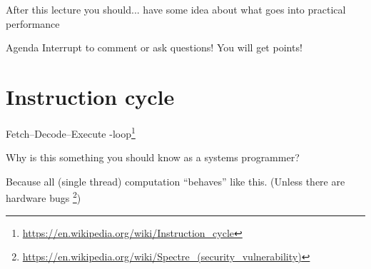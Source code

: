 \documentclass[11pt, aspectratio=169, table]{beamer}
\begin{document}

\begin{frame}{After this lecture you should...}
have some idea about what goes into practical performance
\end{frame}

\begin{frame}{Agenda}
\setlength\parskip{\fill}
\tableofcontents
\alert{Interrupt} to comment or ask questions! You will get \alert{points}!
\end{frame}

\section{Instruction cycle}
\begin{frame}{Fetch--Decode--Execute -loop\footnote{\url{https://en.wikipedia.org/wiki/Instruction_cycle}}}
\setlength{\parskip}{\fill}

Why is this something you should know as a systems programmer?

\pause
Because all (single thread) computation ``behaves'' like this. (Unless there are hardware bugs
\footnote<2->{\url{https://en.wikipedia.org/wiki/Spectre_(security_vulnerability)}})
\end{frame}
\end{document}
